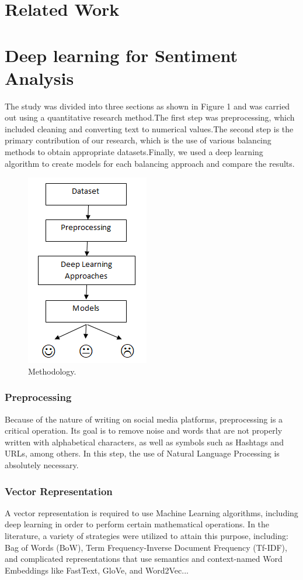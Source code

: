 \documentclass[conference]{IEEEtran}
\begin{document}
	
	\section{Related Work}
	\section{Deep learning for Sentiment Analysis}
	The study was divided into three sections as shown in Figure 1 and was carried out using a quantitative research method.The first step was preprocessing, which included cleaning and converting text to numerical values.The second step is the primary contribution of our research, which is the use of various balancing methods to obtain appropriate datasets.Finally, we used a deep learning algorithm to create models for each balancing approach and compare the results. 
	
	
	\begin{figure}[htbp]
		\centerline{\includegraphics[scale=0.50]{images/baseline}}
		\caption{Methodology.}
		\label{fig}
	\end{figure}
	
	\subsubsection{Preprocessing}
	Because of the nature of writing on social media platforms, preprocessing is a critical operation. Its goal is to remove noise and words that are not properly written with alphabetical characters, as well as symbols such as Hashtags and URLs, among others. In this step, the use of Natural Language Processing is absolutely necessary. \\
	\subsubsection{Vector Representation}
	A vector representation is required to use Machine Learning algorithms, including deep learning in order to perform certain mathematical operations.  In the literature, a variety of strategies were utilized to attain this purpose, including:
	Bag of Words (BoW), Term Frequency-Inverse Document Frequency (Tf-IDF), and complicated representations that use semantics and context-named Word Embeddings like FastText, GloVe, and Word2Vec...\\
\end{document}
